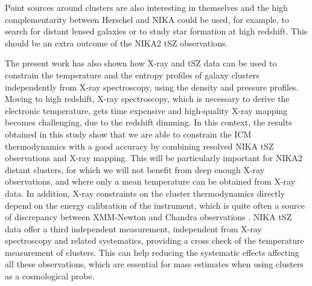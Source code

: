 \documentclass[twocolumn,traditabstract]{aa}
\begin{document}
Point sources around clusters are also interesting in themselves and the high complementarity between Herschel and NIKA could be used, for example, to search for distant lensed galaxies \citep[see for example][]{egami2010} or to study star formation at high redshift. This should be an extra outcome of the NIKA2 tSZ observations.

The present work has also shown how X-ray and tSZ data can be used to constrain the temperature and the entropy profiles of galaxy clusters independently from X-ray spectroscopy, using the density and pressure profiles. Moving to high redshift, X-ray spectroscopy, which is necessary to derive the electronic temperature, gets time expensive and high-quality X-ray mapping becomes challenging, due to the redshift dimming. In this context, the results obtained in this study show that we are able to constrain the ICM thermodynamics with a good accuracy by combining resolved NIKA tSZ observations and X-ray mapping. This will be particularly important for NIKA2 distant clusters, for which we will not benefit from deep enough X-ray observations, and where only a mean temperature can be obtained from X-ray data. In addition, X-ray constraints on the cluster thermodynamics directly depend on the energy calibration of the instrument, which is quite often a source of discrepancy between XMM-Newton and Chandra observations \citep[see for example the recent work of][]{schellenberger2015}. NIKA tSZ data offer a third independent measurement, independent from X-ray spectroscopy and related systematics, providing a cross check of the temperature measurement of clusters. This can help reducing the systematic effects affecting all these observations, which are essential for mass estimates when using clusters as a cosmological probe.
\end{document}
